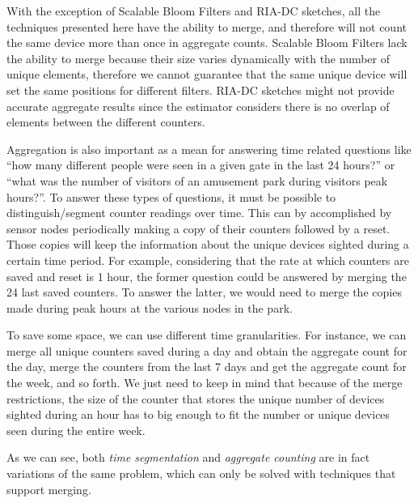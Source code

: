With the exception of Scalable Bloom Filters and RIA-DC sketches, all
the techniques presented here have the ability to merge, and therefore
will not count the same device more than once in aggregate
counts. Scalable Bloom Filters lack the ability to merge because their
size varies dynamically with the number of unique elements, therefore
we cannot guarantee that the same unique device will set the same
positions for different filters. RIA-DC sketches might not provide
accurate aggregate results since the estimator considers there is no
overlap of elements between the different counters.

Aggregation is also important as a mean for answering time related
questions like ``how many different people were seen in a given gate
in the last 24 hours?'' or ``what was the number of visitors of an
amusement park during visitors peak hours?''. To answer these types of
questions, it must be possible to distinguish/segment counter readings
over time. This can by accomplished by sensor nodes periodically
making a copy of their counters followed by a reset. Those copies will
keep the information about the unique devices sighted during a certain
time period. For example, considering that the rate at which counters
are saved and reset is 1 hour, the former question could be answered
by merging the 24 last saved counters. To answer the latter, we would
need to merge the copies made during peak hours at the various nodes
in the park.

To save some space, we can use different time granularities. For
instance, we can merge all unique counters saved during a day and
obtain the aggregate count for the day, merge the counters from the
last 7 days and get the aggregate count for the week, and so forth. We
just need to keep in mind that because of the merge restrictions, the
size of the counter that stores the unique number of devices sighted
during an hour has to big enough to fit the number or unique devices
seen during the entire week.

As we can see, both \emph{time segmentation} and \emph{aggregate counting}
are in fact variations of the same problem, which can only be solved with
techniques that support merging.

